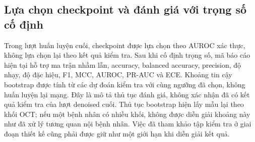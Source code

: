 \documentclass[14pt,a4paper,oneside]{extreport}
\begin{document}
%
%
%
\subsection{Lựa chọn checkpoint và đánh giá với trọng số cố định}
Trong lượt huấn luyện cuối, checkpoint được lựa chọn theo AUROC xác
thực, không lựa chọn lại theo kết quả kiểm tra. Sau khi cố định trọng
số, mã báo cáo hiện tại hỗ trợ ma trận nhầm lẫn, accuracy, balanced
accuracy, precision, độ nhạy, độ đặc hiệu, F1, MCC, AUROC, PR-AUC và ECE.
Khoảng tin cậy bootstrap được tính từ các dự đoán kiểm tra với cùng
ngưỡng đã chọn, không huấn luyện lại mạng. Đây là mô tả thủ tục đánh
giá, không xác nhận đã có kết quả kiểm tra của lượt denoised cuối.
Thủ tục bootstrap hiện lấy mẫu lại theo khối OCT; nếu một bệnh nhân
có nhiều khối, không được diễn giải khoảng này như đã xử lý tương
quan nội bệnh nhân. Việc đã tham khảo tập kiểm tra ở giai đoạn thiết
kế cũng phải được giữ như một giới hạn khi diễn giải kết quả.
\end{document}
